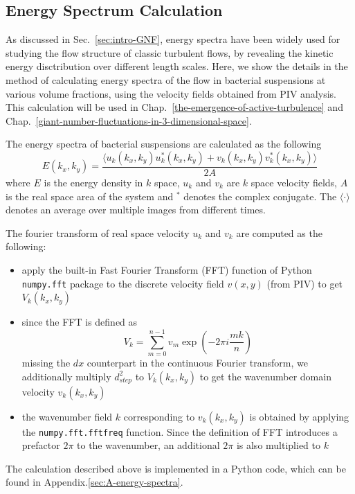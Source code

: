 \subsection{Energy Spectrum Calculation}
As discussed in Sec.~\ref{sec:intro-GNF}, energy spectra have been widely used for studying the flow structure of classic turbulent flows, by revealing the kinetic energy disctribution over different length scales. Here, we show the details in the method of calculating energy spectra of the flow in bacterial suspensions at various volume fractions, using the velocity fields obtained from PIV analysis. This calculation will be used in Chap.~\ref{the-emergence-of-active-turbulence} and Chap.~\ref{giant-number-fluctuations-in-3-dimensional-space}.

The energy spectra of bacterial suspensions are calculated as the following
%
\begin{equation}
E(k_x, k_y) = \frac{\langle u_k(k_x, k_y)u^*_k(k_x, k_y)+v_k(k_x, k_y)v_k^*(k_x, k_y)\rangle}{2A}
\end{equation}
%
where $E$ is the energy density in $k$ space, $u_k$ and $v_k$ are $k$ space velocity fields, $A$ is the real space area of the system and $^*$ denotes the complex conjugate. The $\langle\cdot\rangle$ denotes an average over multiple images from different times.

The fourier transform of real space velocity $u_k$ and $v_k$ are computed as the following:
\begin{itemize}
  \item apply the built-in Fast Fourier Transform (FFT) function of Python \texttt{numpy.fft} package to the discrete velocity field $v(x, y)$ (from PIV) to get $V_k(k_x, k_y)$
  \item since the FFT is defined as
    $$
    V_k=\sum^{n-1}_{m=0}v_m\exp(-2\pi i \frac{mk}{n})
    $$
    missing the $dx$ counterpart in the continuous Fourier transform, we additionally multiply $d_{step}^2$ to $V_k(k_x, k_y)$ to get the wavenumber domain velocity $v_k(k_x, k_y)$
  \item the wavenumber field $k$ corresponding to $v_k(k_x, k_y)$ is obtained by applying the \texttt{numpy.fft.fftfreq} function. Since the definition of FFT introduces a prefactor $2\pi$ to the wavenumber, an additional $2\pi$ is also multiplied to $k$
\end{itemize}

The calculation described above is implemented in a Python code, which can be found in Appendix.\ref{sec:A-energy-spectra}.

